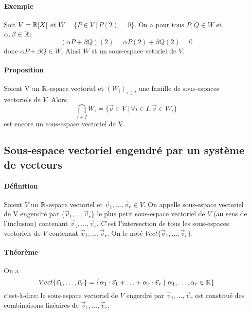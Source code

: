 \paragraph{Exemple} Soit $V=\mathbb{R}[X]$ et $W=\{ P \in V ~ | ~ P(2)=0\}$.
On a pour tous $P, Q \in W$ et $\alpha, \beta \in \mathbb{R}$: $$(\alpha P + \beta Q)(2)=\alpha P(2) + \beta Q(2)=0$$ donc $\alpha P + \beta Q \in W$. Ainsi $W$ st un sous-espace vetoriel de $V$.

\paragraph{Proposition} Soient V un $\mathbb{R}$-espace vectoriel et $(W_i)_{i \in I}$ une famille de sous-espaces vectoriels de $V$. Alors 
$$\bigcap_{i \in I} W_i = \{ \vec{v} \in V ~ \vert ~ \forall i \in I, \vec{v} \in W_i\}$$
est encore un sous-espace vectoriel de V.

%
\subsection{Sous-espace vectoriel engendré par un système de vecteurs}
%
\paragraph{Définition} Soient $V$ un $\mathbb{R}$-espace vectoriel et $\vec{v}_1, \ldots, \vec{v}_r \in V$. On appelle sous-espace vectoriel de V engendré par $\{\vec{v}_1, \ldots, \vec{v}_r\}$ le plus petit sous-espace vectoriel de $V$ (au sens de l'inclusion) contenant $\vec{v}_1, \ldots, \vec{v}_r$. C'est l'intersection de tous les sous-espaces vectoriels de $V$ contenant $\vec{v}_1, \ldots, \vec{v}_r$. On le noté $Vect\{\vec{v}_1, \ldots, \vec{v}_r\}$.

\paragraph{Théorème} On a 
$$Vect\{\vec{v}_1, \ldots, \vec{v}_r\} = \{\alpha_1 \cdot \vec{v}_1 + \ldots + \alpha_r \cdot \vec{v}_r ~ | ~ \alpha_1, \ldots, \alpha_r \in \mathbb{R} \}$$
c'est-à-dire: le sous-espace vectoriel de $V$ engerdré par $\vec{v}_1, \ldots, \vec{v}_r$ est constitué des combinaisons linéaires de $\vec{v}_1, \ldots, \vec{v}_r$.

